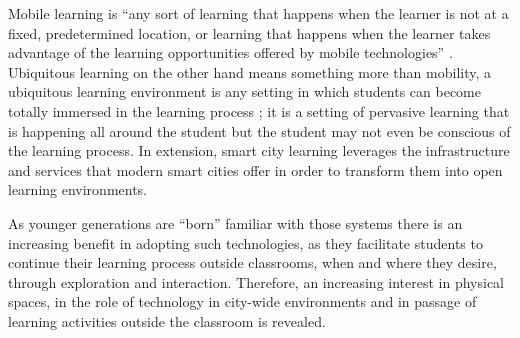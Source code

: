 Mobile learning is “any sort of learning that happens when the learner is not at a fixed, predetermined location, or learning that happens when the learner takes advantage of the learning opportunities offered by mobile technologies” \cite{omalley_guidelines_2005}. Ubiquitous learning on the other hand means something more than mobility, a ubiquitous learning environment is any setting in which students can become totally immersed in the learning process \cite{syvanen_supporting_2005}; it is a setting of pervasive learning that is happening all around the student but the student may not even be conscious of the learning process. In extension, smart city learning leverages the infrastructure and services that modern smart cities offer in order to transform them into open learning environments.\cite{christopoulou_learning_2013}

As younger generations are “born” familiar with those systems there is an increasing benefit in adopting such technologies, as they facilitate students to continue their learning process outside classrooms, when and where they desire, through exploration and interaction. Therefore, an increasing interest in physical spaces, in the role of technology in city-wide environments and in passage of learning activities outside the classroom is revealed.\cite{christopoulou_learning_2013}

